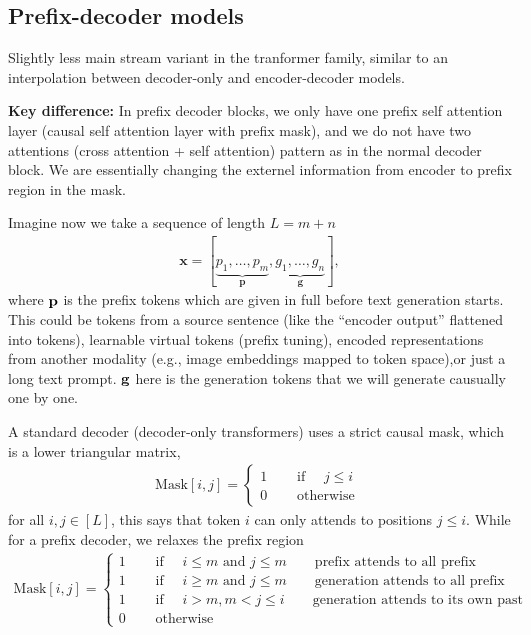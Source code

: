\documentclass[11pt]{article}  %
\begin{document}
\subsection{Prefix-decoder models}
Slightly less main stream variant in the tranformer family, similar to an interpolation between decoder-only and encoder-decoder models.

\textbf{Key difference:} In prefix decoder blocks, we only have one prefix self attention layer (causal self attention layer with prefix mask), and we do not have two attentions (cross attention + self attention) pattern as in the normal decoder block.
We are essentially changing the externel information from encoder to prefix region in the mask.


Imagine now we take a sequence of length $L = m + n$
\begin{align*}
  \textbf{x} = [\underbrace{p_1, \hdots, p_m}_{\textbf{p}}, \underbrace{g_1, \hdots, g_n}_{\textbf{g}}],
\end{align*}
where $\mathbf{p}$ is the prefix tokens which are given in full before text generation starts.
This could be tokens from a source sentence (like the ``encoder output'' flattened into tokens), learnable virtual tokens (prefix tuning), encoded representations from another modality (e.g., image embeddings mapped to token space),or just a long text prompt. $\mathbf{g}$ here is the generation tokens that we will generate causually one by one.

A standard decoder (decoder-only transformers) uses a strict causal mask, which is a lower triangular matrix,
\begin{align*}
  \text{Mask}[i, j] = \begin{cases}
    1 &\quad \text{ if } \quad j \leq i \\
    0 &\quad \text{ otherwise }
  \end{cases}
\end{align*}
for all $i, j \in [L]$, this says that token $i$ can only attends to positions $j \leq i$.
While for a prefix decoder, we relaxes the prefix region 
\begin{align*}
  \text{Mask}[i, j] = \begin{cases}
    1 & \quad \text{ if } \quad i \leq m \text{ and } j \leq m \qquad \text{prefix attends to all prefix} \\
    1 & \quad \text{ if } \quad i \geq m \text{ and } j \leq m \qquad \text{generation attends to all prefix} \\
    1 & \quad \text{ if } \quad i > m, m < j \leq i \qquad \text{generation attends to its own past}\\
    0 & \quad \text{ otherwise }
  \end{cases}
\end{align*}
\end{document}
